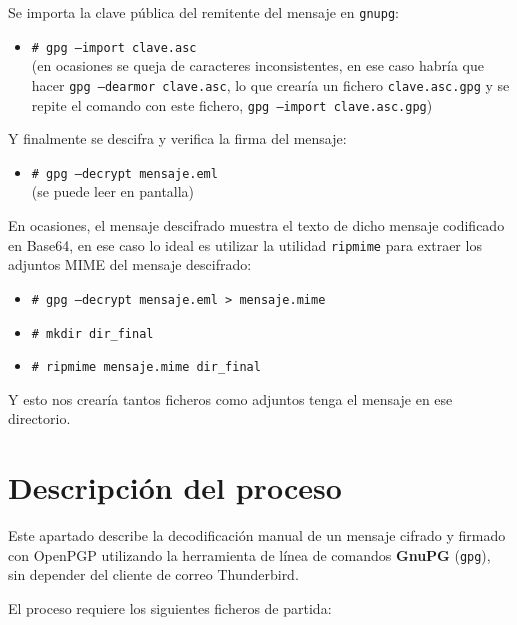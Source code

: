 Se importa la clave pública del remitente del mensaje en \texttt{gnupg}:

\begin{itemize}[label=\textbullet]
    \item \texttt{\# gpg --import clave.asc} \\
    (en ocasiones se queja de caracteres inconsistentes, en ese caso habría que hacer \texttt{gpg --dearmor clave.asc}, lo que crearía un fichero \texttt{clave.asc.gpg} y se repite el comando con este fichero, \texttt{gpg --import clave.asc.gpg})
\end{itemize}

Y finalmente se descifra y verifica la firma del mensaje:

\begin{itemize}[label=\textbullet]
    \item \texttt{\# gpg --decrypt mensaje.eml} \\
    (se puede leer en pantalla)
\end{itemize}

En ocasiones, el mensaje descifrado muestra el texto de dicho mensaje codificado en Base64, en ese
caso lo ideal es utilizar la utilidad \texttt{ripmime} para extraer los adjuntos MIME del mensaje descifrado:

\begin{itemize}[label=\textbullet]
    \item \texttt{\# gpg --decrypt mensaje.eml > mensaje.mime}
    \item \texttt{\# mkdir dir\_final}
    \item \texttt{\# ripmime mensaje.mime dir\_final}
\end{itemize}

Y esto nos crearía tantos ficheros como adjuntos tenga el mensaje en ese directorio.

\section{Descripción del proceso}

Este apartado describe la decodificación manual de un mensaje cifrado y firmado con OpenPGP utilizando la herramienta de línea de comandos \textbf{GnuPG} (\texttt{gpg}), sin depender del cliente de correo Thunderbird.

El proceso requiere los siguientes ficheros de partida:

